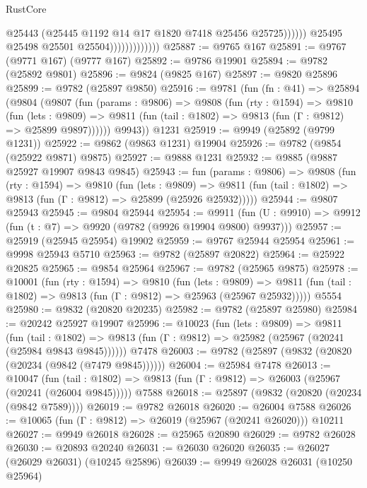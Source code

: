\begin{lexlean}{RustCore}
\begin{coremodule}
                                        @25443
                                        (@25445 @1192 @14 @17 @1820 @7418 @25456 @25725))))))
                              @25495
                              @25498
                              @25501
                              @25504)))))))))))))
@25887 := @9765 @167
@25891 := @9767 (@9771 @167) (@9777 @167)
@25892 := @9786 @19901
@25894 := @9782 (@25892 @9801)
@25896 := @9824 (@9825 @167)
@25897 := @9820 @25896
@25899 := @9782 (@25897 @9850)
@25916 := @9781
    (fun (fn : @41) =>
    @25894
      (@9804
        (@9807
          (fun (params : @9806) =>
          @9808
            (fun (rty : @1594) =>
            @9810
              (fun (lets : @9809) =>
              @9811 (fun (tail : @1802) => @9813 (fun (Γ : @9812) => @25899 @9897))))))
        @9943))
    @1231
@25919 := @9949 (@25892 (@9799 @1231))
@25922 := @9862 (@9863 @1231) @19904
@25926 := @9782 (@9854 (@25922 @9871) @9875)
@25927 := @9888 @1231
@25932 := @9885 (@9887 @25927 @19907 @9843 @9845)
@25943 := fun (params : @9806) =>
  @9808
    (fun (rty : @1594) =>
    @9810
      (fun (lets : @9809) =>
      @9811 (fun (tail : @1802) => @9813 (fun (Γ : @9812) => @25899 (@25926 @25932)))))
@25944 := @9807 @25943
@25945 := @9804 @25944
@25954 := @9911
    (fun (U : @9910) => @9912 (fun (t : @7) => @9920 (@9782 (@9926 @19904 @9800) @9937)))
@25957 := @25919 (@25945 @25954) @19902
@25959 := @9767 @25944 @25954
@25961 := @9998 @25943 @5710
@25963 := @9782 (@25897 @20822)
@25964 := @25922 @20825
@25965 := @9854 @25964
@25967 := @9782 (@25965 @9875)
@25978 := @10001
    (fun (rty : @1594) =>
    @9810
      (fun (lets : @9809) =>
      @9811 (fun (tail : @1802) => @9813 (fun (Γ : @9812) => @25963 (@25967 @25932)))))
    @5554
@25980 := @9832 (@20820 @20235)
@25982 := @9782 (@25897 @25980)
@25984 := @20242 @25927 @19907
@25996 := @10023
    (fun (lets : @9809) =>
    @9811
      (fun (tail : @1802) =>
      @9813 (fun (Γ : @9812) => @25982 (@25967 (@20241 (@25984 @9843 @9845))))))
    @7478
@26003 := @9782 (@25897 (@9832 (@20820 (@20234 (@9842 (@7479 @9845))))))
@26004 := @25984 @7478
@26013 := @10047
    (fun (tail : @1802) => @9813 (fun (Γ : @9812) => @26003 (@25967 (@20241 (@26004 @9845)))))
    @7588
@26018 := @25897 (@9832 (@20820 (@20234 (@9842 @7589))))
@26019 := @9782 @26018
@26020 := @26004 @7588
@26026 := @10065 (fun (Γ : @9812) => @26019 (@25967 (@20241 @26020))) @10211
@26027 := @9949 @26018
@26028 := @25965 @20890
@26029 := @9782 @26028
@26030 := @20893 @20240
@26031 := @26030 @26020
@26035 := @26027 (@26029 @26031) (@10245 @25896)
@26039 := @9949 @26028 @26031 (@10250 @25964)

\end{coremodule}
\end{lexlean}
